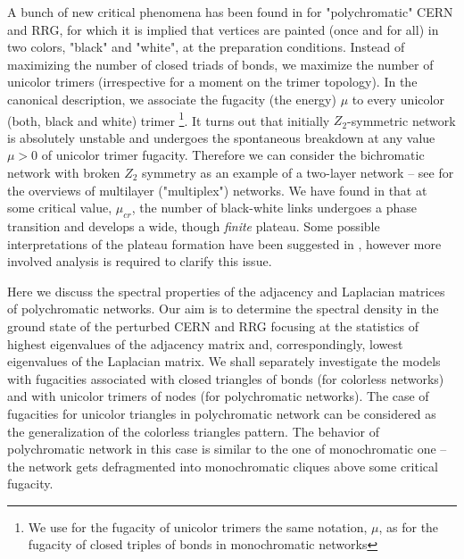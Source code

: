 \documentclass[aps,12pt]{revtex4}
\begin{document}
A bunch of new critical phenomena has been found in \cite{color} for "polychromatic" CERN and RRG, for which it is implied that vertices are painted (once and for all) in two colors, "black" and "white", at the preparation conditions. Instead of maximizing the number of closed triads of bonds, we maximize the number of unicolor trimers (irrespective for a moment on the trimer topology). In the canonical description, we associate the fugacity (the energy) $\mu$ to every unicolor (both, black and white) trimer \footnote{We use for the fugacity of unicolor trimers the same notation, $\mu$, as for the fugacity of closed triples of bonds in monochromatic networks}. It turns out that initially $Z_2$-symmetric network is absolutely unstable and undergoes the spontaneous breakdown at any value $\mu>0$ of unicolor trimer fugacity. Therefore we can consider the bichromatic network with broken $Z_2$ symmetry as an example of a two-layer network -- see \cite{arenasrev, boca} for the overviews of multilayer ("multiplex") networks. We have found in \cite{color} that at some critical value, $\mu_{cr}$, the number of black-white links undergoes a phase transition and develops a wide, though \emph{finite} plateau. Some possible interpretations of the plateau formation have been suggested in \cite{color}, however more involved analysis is required to clarify this issue.

Here we discuss the spectral properties of the adjacency and Laplacian matrices of polychromatic networks. Our aim is to determine the spectral density in the ground state of the perturbed CERN and RRG focusing at the statistics of highest eigenvalues of the adjacency matrix and, correspondingly, lowest eigenvalues of the Laplacian matrix. We shall separately investigate the models with fugacities associated with closed triangles of bonds (for colorless networks) and with unicolor trimers of nodes (for polychromatic networks). The case of fugacities for unicolor triangles in polychromatic network can be considered as the generalization of the colorless triangles pattern. The behavior of polychromatic network in this case is similar to the one of monochromatic one -- the network gets defragmented into monochromatic cliques above some critical fugacity.
\end{document}
